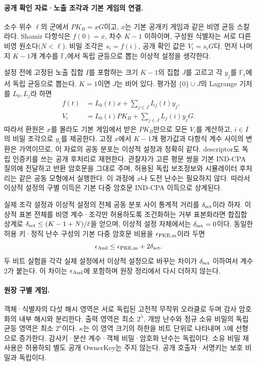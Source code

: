 \paragraph{공개 확인 자료·노출 조각과 기본 게임의 연결.}
소수 위수 $\ell$의 군에서 $PK_B=xG$이고,
$x$는 기본 공개키 게임과 같은 비영 균등 스칼라다.
Shamir 다항식은 $f(0)=x$, 차수 $K-1$ 이하이며,
구성원 식별자는 서로 다른 비영 원소다($N<\ell$).
비밀 조각은 $s_i=f(i)$, 공개 확인 값은 $V_i=s_iG$다.
먼저 나머지 $K-1$개 계수를 $\mathbb F_\ell$에서 독립 균등으로
뽑는 이상적 설정을 생각한다.

설정 전에 고정된 노출 집합 $I$를 포함하는 크기 $K-1$의 집합 $J$를
고르고 각 $y_j$를 $\mathbb F_\ell$에서 독립 균등으로 뽑는다.
$K=1$이면 $J$는 비어 있다.
평가점 $\{0\}\cup J$의 Lagrange 기저를 $L_0,L_j$라 하면
\begin{equation}
 \begin{aligned}
 f(t)&=L_0(t)x+\sum_{j\in J}L_j(t)y_j,\\
 V_i&=L_0(i)PK_B+\sum_{j\in J}L_j(i)y_jG.
 \end{aligned}
 \label{eq:audit-share-simulation}
\end{equation}
따라서 환원은 $x$를 몰라도 기본 게임에서 받은 $PK_B$만으로
모든 $V_i$를 계산하고, $i\in I$의 비밀 조각으로 $y_i$를 제공한다.
고정 $x$에서 $K-1$개 평가값과 다항식 계수 사이의 변환은 가역이므로,
이 자료의 공동 분포는 이상적 설정과 정확히 같다.
descriptor도 독립 인증키를 쓰는 공개 후처리로 재현한다.
관찰자가 고른 평문 쌍을 기본 IND-CPA 질의에 전달하고 반환 암호문을
그대로 주며, 허용된 독립 보조정보와 시뮬레이터 후처리는 같은 공동
모형에서 실행한다. 이 과정에 $x$나 도전 난수는 필요하지 않다.
따라서 이상적 설정의 구별 이득은 기본 다중 암호문 IND-CPA 이득으로
상계된다.

실제 조각 설정과 이상적 설정의 전체 공동 분포 사이 통계적 거리를
$\delta_{\rm set}$이라 하자. 이상적 표본 전체를 비영 계수·조각만
허용하도록 조건화하는 거부 표본화라면 합집합 상계로
$\delta_{\rm set}\leq(K-1+N)/\ell$을 얻으며,
이상적 설정 자체에서는 $\delta_{\rm set}=0$이다.
동일한 허용 키·정직 난수 구성의 기본 다중 암호문 비용을
$\epsilon_{\rm PKE,m}$이라 두면
\begin{equation}
 \epsilon_{\rm Aud}\leq\epsilon_{\rm PKE,m}+2\delta_{\rm set}.
 \label{eq:audit-indcpa-connection}
\end{equation}
두 비트 실험을 각각 실제 설정에서 이상적 설정으로 바꾸는 차이가
$\delta_{\rm set}$ 이하여서 계수 2가 붙는다.
이 차이는 $\epsilon_{\rm Aud}$에 포함하며 원장 정리에서 다시 더하지 않는다.

\paragraph{원장 구별 게임.}
객체·식별자의 다섯 해시 영역은 서로 독립된 고전적 무작위
오라클로 두며 감사 암호화의 내부 해시와 분리한다.
출력 영역은 최소 $2^\lambda$, 개방 난수와 정규 소유 비밀의
독립 균등 영역은 최소 $2^\kappa$이다. $\kappa$는 이 영역 크기의
하한을 비트 단위로 나타내며 $\lambda$에 선형으로 증가한다.
감사키·분산 계수·객체 비밀·암호화 난수는
독립이다. 소유 비밀 재사용은 허용하되 별도 공개 OwnerKey는 주지 않는다.
공개 호출자·서명키는 보호 비밀과 독립이다.

